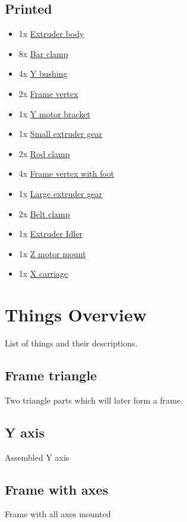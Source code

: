 \documentclass[11pt]{article}
\begin{document}
\subsection{Printed}
\begin{itemize}
\item 1x \hyperlink{thing_extruder-body}{Extruder body}
\item 8x \hyperlink{thing_bar-clamp}{Bar clamp}
\item 4x \hyperlink{thing_y-bushing}{Y bushing}
\item 2x \hyperlink{thing_frame-vertex}{Frame vertex}
\item 1x \hyperlink{thing_y-motor-bracket}{Y motor bracket}
\item 1x \hyperlink{thing_small-gear}{Small extruder gear}
\item 2x \hyperlink{thing_rod-clamp}{Rod clamp}
\item 4x \hyperlink{thing_frame-vertex-foot}{Frame vertex with foot}
\item 1x \hyperlink{thing_large-gear}{Large extruder gear}
\item 2x \hyperlink{thing_belt-clamp}{Belt clamp}
\item 1x \hyperlink{thing_idler}{Extruder Idler}
\item 1x \hyperlink{thing_z-motor-mount}{Z motor mount}
\item 1x \hyperlink{thing_x-carriage}{X carriage}
\end{itemize}

\newpage

\section{Things Overview}
List of things and their descriptions.

\hypertarget{thing_frame-triangle}{\subsection{Frame triangle}}
Two triangle parts which will later form a frame.

\hypertarget{thing_y-axis}{\subsection{Y axis}}
Assembled Y axis

\hypertarget{thing_frame-with-axes}{\subsection{Frame with axes}}
Frame with all axes mounted
\end{document}
